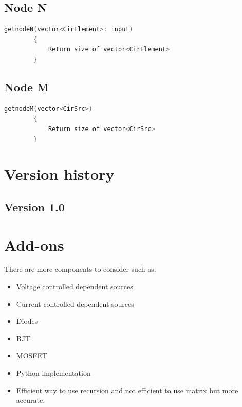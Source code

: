 \documentclass[a4paper, titlepage]{article}
\begin{document}
    \subsection{Node N}
    \begin{lstlisting}[language=C++]
        getnodeN(vector<CirElement>: input)
        {
            Return size of vector<CirElement>
        }
    \end{lstlisting}
    \subsection{Node M}
    \begin{lstlisting}[language=C++]
        getnodeM(vector<CirSrc>)
        {
            Return size of vector<CirSrc>
        }
    \end{lstlisting}
    \pagebreak
    \section{Version history}
    \subsection{Version 1.0}

    \pagebreak
    \section{Add-ons}
    There are more components to consider such as:
    \begin{itemize}
        \item Voltage controlled dependent sources
        \item Current controlled dependent sources
        \item Diodes
        \item BJT
        \item MOSFET
        \item Python implementation
        \item Efficient way to use recursion and not efficient to use matrix but more accurate.
    \end{itemize}
    
    \pagebreak
    \printbibliography[title={References}]
\end{document}

